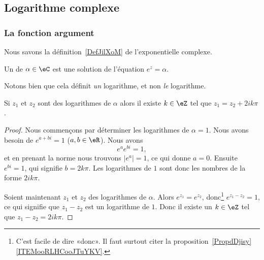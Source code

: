 \subsection{Logarithme complexe}


\subsubsection{La fonction argument}

Nous savons la définition~\ref{DefJilXoM} de l'exponentielle complexe.

\begin{definition}
	Un  de \( \alpha\in \eC\) est une solution de l'équation \(  e^{z}=\alpha\).
\end{definition}
Notons bien que cela définit \emph{un} logarithme, et non \emph{le} logarithme.

\begin{lemma}       \label{LEMooUMESooJVzeDb}
	Si \( z_1\) et \( z_2\) sont des logarithmes de \( \alpha\) alors il existe \( k\in \eZ\) tel que \( z_1=z_2+2ik\pi\).
\end{lemma}

\begin{proof}
	Nous commençons par déterminer les logarithmes de \( \alpha=1\). Nous avons besoin de \(  e^{a+bi}=1\) (\( a,b\in \eR\)). Nous avons
	\begin{equation}
		e^{a} e^{bi}=1,
	\end{equation}
	et en prenant la norme nous trouvons \( | e^a |=1\), ce qui donne \( a=0\). Ensuite \(  e^{bi}=1\), qui signifie \( b=2k\pi\). Les logarithmes de \( 1\) sont donc les nombres de la forme \( 2ik\pi\).

	Soient maintenant \( z_1\) et \( z_2\) des logarithmes de \( \alpha\). Alors \(  e^{z_1}= e^{z_2}\), donc\footnote{C'est facile de dire «donc». Il faut surtout citer la proposition~\ref{PropdDjisy}\ref{ITEMooRLHCooJTuYKV}.} \(  e^{z_1-z_2}=1\), ce qui signifie que \( z_1-z_2\) est un logarithme de \( 1\). Donc il existe un \( k\in \eZ\) tel que \( z_1-z_2=2ik\pi\).
\end{proof}

